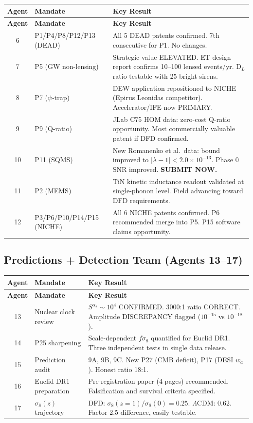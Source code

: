 \documentclass[11pt]{article}
\newcommand{\ee}[1]{\times 10^{#1}}
\newcommand{\LCDM}{$\Lambda$CDM}
\begin{document}
\begin{longtable}{clp{8cm}}
\toprule
\textbf{Agent} & \textbf{Mandate} & \textbf{Key Result} \\
\midrule
\endfirsthead
\toprule
\textbf{Agent} & \textbf{Mandate} & \textbf{Key Result} \\
\midrule
\endhead
6 & P1/P4/P8/P12/P13 (DEAD) & All 5 DEAD patents confirmed.
  7th consecutive for P1.  No changes. \\
7 & P5 (GW non-lensing) & Strategic value ELEVATED.  ET design report
  confirms 10--100 lensed events/yr.  D$_L$ ratio testable with 25
  bright sirens. \\
8 & P7 ($\psi$-trap) & DEW application repositioned to NICHE (Epirus
  Leonidas competitor).  Accelerator/IFE now PRIMARY. \\
9 & P9 (Q-ratio) & JLab C75 HOM data: zero-cost Q-ratio opportunity.
  Most commercially valuable patent if DFD confirmed. \\
10 & P11 (SQMS) & New Romanenko et al.\ data: bound improved to
  $|\lambda-1| < 2.0\ee{-13}$.  Phase 0 SNR improved.
  \textbf{SUBMIT NOW.} \\
11 & P2 (MEMS) & TiN kinetic inductance readout validated at
  single-phonon level.  Field advancing toward DFD requirements. \\
12 & P3/P6/P10/P14/P15 (NICHE) & All 6 NICHE patents confirmed.
  P6 recommended merge into P5.  P15 software claims opportunity. \\
\bottomrule
\end{longtable}


\subsection{Predictions + Detection Team (Agents 13--17)}

\begin{longtable}{clp{8cm}}
\toprule
\textbf{Agent} & \textbf{Mandate} & \textbf{Key Result} \\
\midrule
\endfirsthead
\toprule
\textbf{Agent} & \textbf{Mandate} & \textbf{Key Result} \\
\midrule
\endhead
13 & Nuclear clock review & $S^{\alpha_s} \sim 10^4$ CONFIRMED.
  3000:1 ratio CORRECT.  Amplitude DISCREPANCY flagged
  ($10^{-15}$ vs $10^{-18}$). \\
14 & P25 sharpening & Scale-dependent $f\sigma_8$ quantified for Euclid
  DR1.  Three independent tests in single data release. \\
15 & Prediction audit & 9A, 9B, 9C.  New P27 (CMB deficit), P17
  (DESI $w_a$).  Honest ratio 18:1. \\
16 & Euclid DR1 preparation & Pre-registration paper (4 pages) recommended.
  Falsification and survival criteria specified. \\
17 & $\sigma_8(z)$ trajectory & DFD: $\sigma_8(z=1)/\sigma_8(0) = 0.25$.
  \LCDM: 0.62.  Factor 2.5 difference, easily testable. \\
\bottomrule
\end{longtable}
\end{document}
